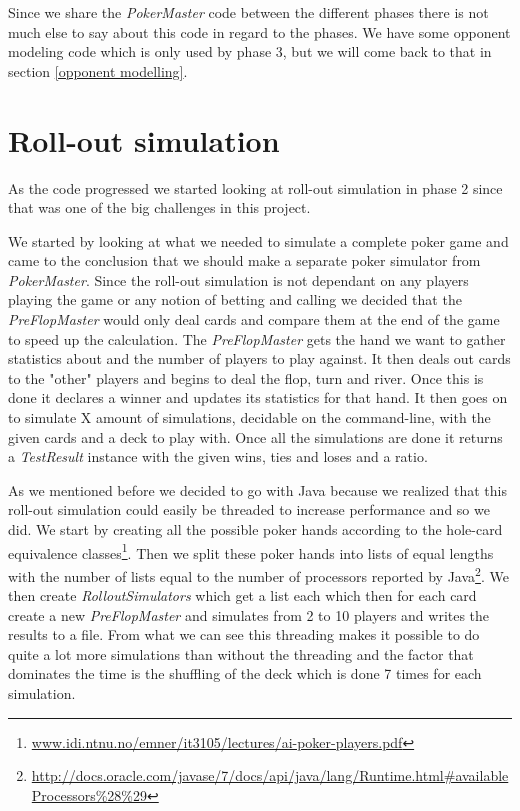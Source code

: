 \documentclass[titlepage, a4paper]{article}
\begin{document}
Since we share the \textit{PokerMaster} code between the different phases there
is not much else to say about this code in regard to the phases. We have some
opponent modeling code which is only used by phase 3, but we will come back to that
in section \ref{opponent modelling}.

\section{Roll-out simulation}\label{roll-out simulation}
As the code progressed we started looking at roll-out simulation in phase 2 since
that was one of the big challenges in this project.

We started by looking at what we needed to simulate a complete poker game and came
to the conclusion that we should make a separate poker simulator from \textit{PokerMaster}.
Since the roll-out simulation is not dependant on any players playing the game
or any notion of betting and calling we decided that the \textit{PreFlopMaster}
would only deal cards and compare them at the end of the game to speed up the 
calculation. The \textit{PreFlopMaster} gets the hand we want to gather statistics
about and the number of players to play against. It then deals out cards to the
"other" players and begins to deal the flop, turn and river. Once this is done
it declares a winner and updates its statistics for that hand. It then goes on to
simulate X amount of simulations, decidable on the command-line, with the given cards
and a deck to play with. Once all the simulations are done it returns a
\textit{TestResult} instance with the given wins, ties and loses and a ratio.

As we mentioned before we decided to go with Java because we realized that this roll-out
simulation could easily be threaded to increase performance and so we did. We
start by creating all the possible poker hands according to the hole-card equivalence
classes\footnote{\url{www.idi.ntnu.no/emner/it3105/lectures/ai-poker-players.pdf}}.
Then we split these poker hands into lists of equal lengths with the number of
lists equal to the number of processors reported by Java\footnote{\url{http://docs.oracle.com/javase/7/docs/api/java/lang/Runtime.html\#availableProcessors\%28\%29}}.
We then create \textit{RolloutSimulators} which get a list each which then for each
card create a new \textit{PreFlopMaster} and simulates from 2 to 10 players and
writes the results to a file. From what we can see this threading makes it possible
to do quite a lot more simulations than without the threading and the factor
that dominates the time is the shuffling of the deck which is done 7 times for
each simulation.
\end{document}
